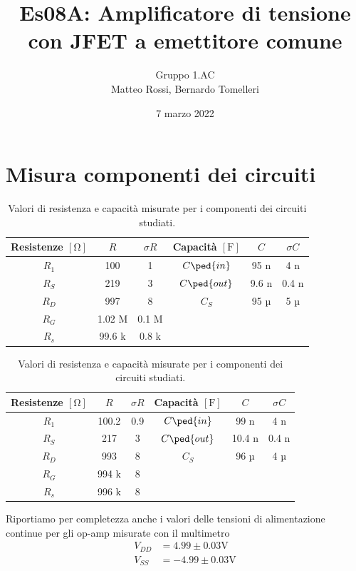 \documentclass[10pt, a4paper, italian]{article}
\author{Gruppo 1.AC \\ Matteo Rossi, Bernardo Tomelleri}
\title{Es08A: Amplificatore di tensione con JFET a emettitore comune}
\begin{document}
\date{7 marzo 2022}
\maketitle

\setcounter{section}{0}

\section{Misura componenti dei circuiti}
\begin{table}[htbp]
\centering
\begin{tabular}{cccccc}
\toprule
Resistenze $[\si{\ohm}]$ & $R$ & $\sigma R$ & Capacità $[\si{\F}]$ & $C$ &
$\sigma C$ \\
\midrule
\midrule
$R_1$	  & 100 	& 1 	 & $C\ped{in}$ & 95	n	 & 4 n \\
$R_S$	  & 219	& 3 	 & $C\ped{out}$ & 9.6 n	 & 0.4 n \\
$R_D$	  & 997		& 8	 	 & $C_S$ 		& 95  µ  & 5 µ \\
$R_G$	  & 1.02 M	& 0.1 M	 & & & \\
$R_s$	  & 99.6 k	& 0.8 k	 & & & \\
\bottomrule     
\end{tabular}
\caption{Valori di resistenza e capacità misurate per i componenti dei
circuiti studiati. \label{tab: rcmes_M}}
\end{table}

\begin{table}[htbp]
\centering
\begin{tabular}{cccccc}
\toprule
Resistenze $[\si{\ohm}]$ & $R$ & $\sigma R$ & Capacità $[\si{\F}]$ & $C$ &
$\sigma C$ \\
\midrule
\midrule
$R_1$	  & 100.2 	& 0.9 	 & $C\ped{in}$ & 99	n	 & 4 n \\
$R_S$	  & 217	& 3 	 & $C\ped{out}$ & 10.4 n	 & 0.4 n \\
$R_D$	  & 993		& 8	 	 & $C_S$ 		& 96  µ  & 4 µ \\
$R_G$	  & 994 k	& 8	 & & & \\
$R_s$	  & 996 k	& 8	 & & & \\
\bottomrule     
\end{tabular}
\caption{Valori di resistenza e capacità misurate per i componenti dei
circuiti studiati. \label{tab: rcmes_B}}
\end{table}

Riportiamo per completezza anche i valori delle tensioni di alimentazione
continue per gli op-amp misurate con il multimetro
\begin{align*}
V_{DD} &= 4.99 \pm 0.03 \si{\V} \\
V_{SS} &= -4.99 \pm 0.03 \si{\V}
\end{align*}
\end{document}
